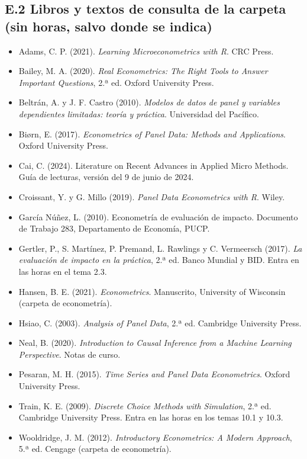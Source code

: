 \documentclass[11pt,a4paper]{article}
\begin{document}
\subsection*{E.2 Libros y textos de consulta de la carpeta (sin horas, salvo donde se indica)}
{\small
\begin{itemize}[leftmargin=1.4em,itemsep=1pt,label={}]
\item Adams, C. P. (2021). \emph{Learning Microeconometrics with R}. CRC Press.
\item Bailey, M. A. (2020). \emph{Real Econometrics: The Right Tools to Answer Important Questions}, 2.ª ed. Oxford University Press.
\item Beltrán, A. y J. F. Castro (2010). \emph{Modelos de datos de panel y variables dependientes limitadas: teoría y práctica}. Universidad del Pacífico.
\item Biørn, E. (2017). \emph{Econometrics of Panel Data: Methods and Applications}. Oxford University Press.
\item Cai, C. (2024). Literature on Recent Advances in Applied Micro Methods. Guía de lecturas, versión del 9 de junio de 2024.
\item Croissant, Y. y G. Millo (2019). \emph{Panel Data Econometrics with R}. Wiley.
\item García Núñez, L. (2010). Econometría de evaluación de impacto. Documento de Trabajo 283, Departamento de Economía, PUCP.
\item Gertler, P., S. Martínez, P. Premand, L. Rawlings y C. Vermeersch (2017). \emph{La evaluación de impacto en la práctica}, 2.ª ed. Banco Mundial y BID. Entra en las horas en el tema 2.3.
\item Hansen, B. E. (2021). \emph{Econometrics}. Manuscrito, University of Wisconsin (carpeta de econometría).
\item Hsiao, C. (2003). \emph{Analysis of Panel Data}, 2.ª ed. Cambridge University Press.
\item Neal, B. (2020). \emph{Introduction to Causal Inference from a Machine Learning Perspective}. Notas de curso.
\item Pesaran, M. H. (2015). \emph{Time Series and Panel Data Econometrics}. Oxford University Press.
\item Train, K. E. (2009). \emph{Discrete Choice Methods with Simulation}, 2.ª ed. Cambridge University Press. Entra en las horas en los temas 10.1 y 10.3.
\item Wooldridge, J. M. (2012). \emph{Introductory Econometrics: A Modern Approach}, 5.ª ed. Cengage (carpeta de econometría).
\end{itemize}
}
\end{document}
